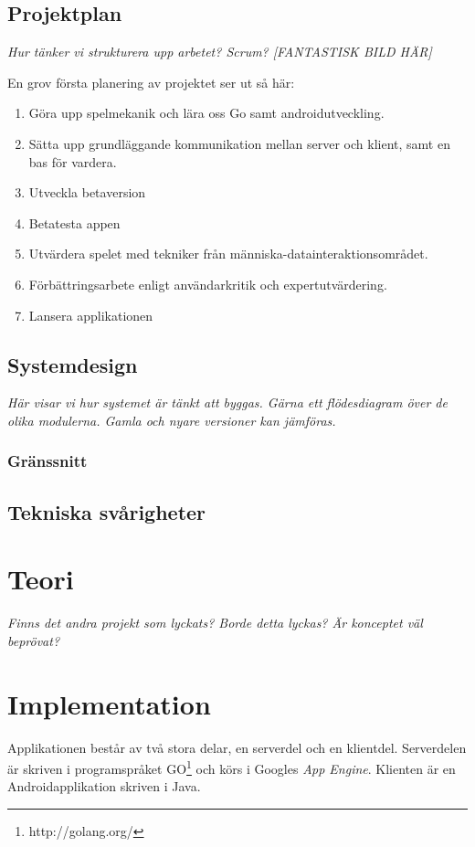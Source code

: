 \documentclass[11pt,a4paper]{article}
\begin{document}
\subsection{Projektplan}

\textit{Hur tänker vi strukturera upp arbetet? Scrum?
[FANTASTISK BILD HÄR]}

En grov första planering av projektet ser ut så här:
\begin{enumerate}
\item Göra upp spelmekanik och lära oss Go samt androidutveckling.
\item Sätta upp grundläggande kommunikation mellan server och klient, samt en bas för vardera.
\item Utveckla betaversion
\item Betatesta appen
\item Utvärdera spelet med tekniker från människa-datainteraktionsområdet.
\item Förbättringsarbete enligt användarkritik och expertutvärdering.
\item Lansera applikationen
\end{enumerate}

\subsection{Systemdesign}
\textit{Här visar vi hur systemet är tänkt att byggas. Gärna ett flödesdiagram över de olika modulerna. Gamla och nyare versioner kan jämföras.}

\subsubsection{Gränssnitt}

\subsection{Tekniska svårigheter}

\section{Teori}
\textit{Finns det andra projekt som lyckats? Borde detta lyckas? Är konceptet väl beprövat?}

\section{Implementation}
Applikationen består av två stora delar, en serverdel och en klientdel. Serverdelen är skriven i programspråket GO\footnote{http://golang.org/} och körs i Googles \textit{App Engine}. Klienten är en Androidapplikation skriven i Java.
\end{document}
